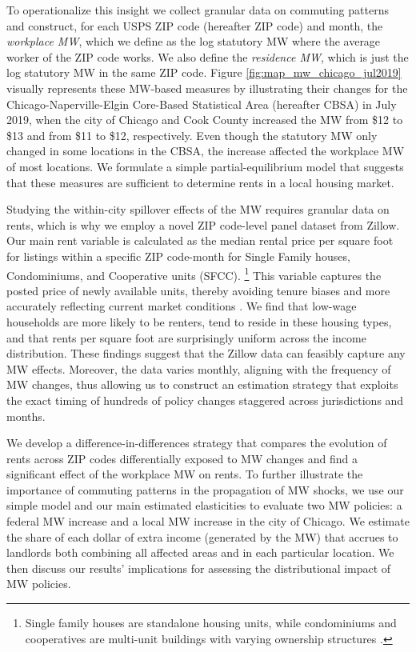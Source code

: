 To operationalize this insight we collect granular data on commuting patterns 
and construct, for each USPS ZIP code (hereafter ZIP code) and month,
the \textit{workplace MW}, which we define as the log statutory MW where
the average worker of the ZIP code works.
We also define the \textit{residence MW}, which is just the log statutory MW in 
the same ZIP code.
Figure \ref{fig:map_mw_chicago_jul2019} visually represents these MW-based 
measures by illustrating their changes for the Chicago-Naperville-Elgin 
Core-Based Statistical Area (hereafter CBSA) in July 2019,
when the city of Chicago and Cook County increased the MW from \$12 to \$13 and 
from \$11 to \$12, respectively.
Even though the statutory MW only changed in some locations in the CBSA, the 
increase affected the workplace MW of most locations.
We formulate a simple partial-equilibrium model that suggests that these 
measures are sufficient to determine rents in a local housing market.

Studying the within-city spillover effects of the MW requires granular data on 
rents, which is why we employ a novel ZIP code-level panel dataset from Zillow.
Our main rent variable is calculated as the median rental price per square foot 
for listings within a specific ZIP code-month for Single Family houses, 
Condominiums, and Cooperative units (SFCC).%
\footnote{Single family houses are standalone housing units, while condominiums 
    and cooperatives are multi-unit buildings with varying ownership structures 
    \parencite{ZillowTypesOfHomes}.}
This variable captures the posted price of newly available units, 
thereby avoiding tenure biases and more accurately reflecting current market 
conditions \parencite{AmbroseEtAl2015}.
We find that low-wage households are more likely to be renters,
tend to reside in these housing types,
and that rents per square foot are surprisingly uniform across the income 
distribution.
These findings suggest that the Zillow data can feasibly capture any MW effects.
Moreover, the data varies monthly, aligning with the frequency of MW 
changes, thus allowing us to construct an estimation strategy that exploits the 
exact timing of hundreds of policy changes staggered across jurisdictions and 
months.

We develop a difference-in-differences strategy that compares the evolution of 
rents across ZIP codes differentially exposed to MW changes and find a 
significant effect of the workplace MW on rents.
To further illustrate the importance of commuting patterns in the propagation 
of MW shocks, we use our simple model and our main estimated elasticities to 
evaluate two MW policies: 
a federal MW increase and
a local MW increase in the city of Chicago.
We estimate the share of each dollar of extra income (generated by the MW) that 
accrues to landlords both combining all affected areas and in each particular 
location.
We then discuss our results' implications for assessing the distributional 
impact of MW policies.

